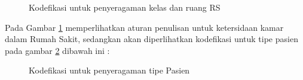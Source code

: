 \begin{figure}[h]	
	{\par}
	\caption{Kodefikasi untuk penyeragaman kelas dan ruang RS}
	\label{fig:kodefikasi1}
\end{figure}
\par Pada Gambar \ref{fig:kodefikasi1} memperlihatkan aturan penulisan untuk ketersidaan kamar dalam Rumah Sakit, sedangkan akan diperlihatkan kodefikasi untuk tipe pasien pada gambar \ref{fig:kodefikasi2} dibawah ini :
\begin{figure}[h]	
	{\par}
	\caption{Kodefikasi untuk penyeragaman tipe Pasien}
	\label{fig:kodefikasi2}
\end{figure}

